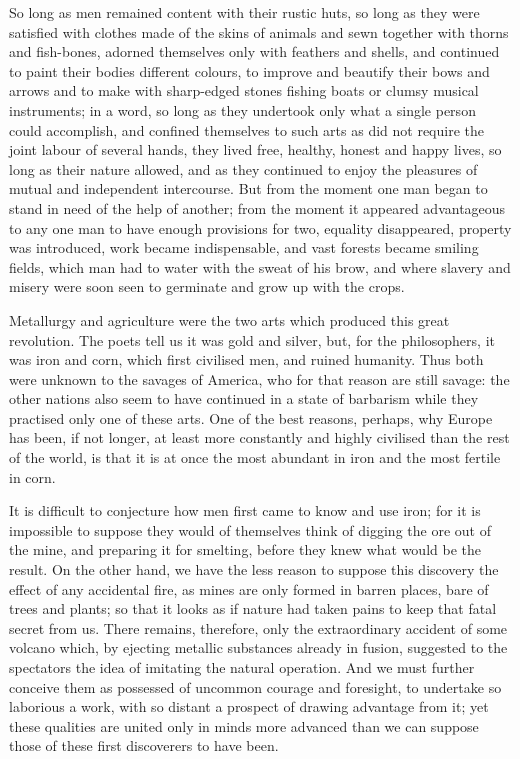 \documentclass[12pt]{report}
\begin{document}
So long as men remained content with their rustic huts, so long as they were satisfied with clothes made of the skins of animals and sewn together with thorns and fish-bones, adorned themselves only with feathers and shells, and continued to paint their bodies different colours, to improve and beautify their bows and arrows and to make with sharp-edged stones fishing boats or clumsy musical instruments; in a word, so long as they undertook only what a single person could accomplish, and confined themselves to such arts as did not require the joint labour of several hands, they lived free, healthy, honest and happy lives, so long as their nature allowed, and as they continued to enjoy the pleasures of mutual and independent intercourse. But from the moment one man began to stand in need of the help of another; from the moment it appeared advantageous to any one man to have enough provisions for two, equality disappeared, property was introduced, work became indispensable, and vast forests became smiling fields, which man had to water with the sweat of his brow, and where slavery and misery were soon seen to germinate and grow up with the crops.

Metallurgy and agriculture were the two arts which produced this great revolution. The poets tell us it was gold and silver, but, for the philosophers, it was iron and corn, which first civilised men, and ruined humanity. Thus both were unknown to the savages of America, who for that reason are still savage: the other nations also seem to have continued in a state of barbarism while they practised only one of these arts. One of the best reasons, perhaps, why Europe has been, if not longer, at least more constantly and highly civilised than the rest of the world, is that it is at once the most abundant in iron and the most fertile in corn.

It is difficult to conjecture how men first came to know and use iron; for it is impossible to suppose they would of themselves think of digging the ore out of the mine, and preparing it for smelting, before they knew what would be the result. On the other hand, we have the less reason to suppose this discovery the effect of any accidental fire, as mines are only formed in barren places, bare of trees and plants; so that it looks as if nature had taken pains to keep that fatal secret from us. There remains, therefore, only the extraordinary accident of some volcano which, by ejecting metallic substances already in fusion, suggested to the spectators the idea of imitating the natural operation. And we must further conceive them as possessed of uncommon courage and foresight, to undertake so laborious a work, with so distant a prospect of drawing advantage from it; yet these qualities are united only in minds more advanced than we can suppose those of these first discoverers to have been.
\end{document}
